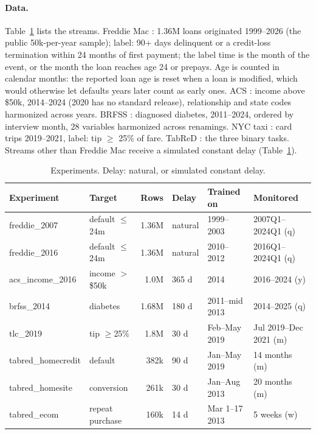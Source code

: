\documentclass[11pt]{article}
\begin{document}
\paragraph{Data.} Table~\ref{tab:streams} lists the streams. Freddie Mac
\citep{freddiemac_sflld}: 1.36M loans originated 1999--2026 (the public 50k-per-year sample);
label: 90+ days delinquent or a credit-loss termination within 24 months of first payment; the
label time is the month of the event, or the month the loan reaches age 24 or prepays. Age is
counted in calendar months: the reported loan age is reset when a loan is modified, which would
otherwise let defaults years later count as early ones. ACS
\citep{ding2021folktables}: income above \$50k, 2014--2024 (2020 has no standard release),
relationship and state codes harmonized across years. BRFSS \citep{cdc_brfss}: diagnosed
diabetes, 2011--2024, ordered by interview month, 28 variables harmonized across renamings.
NYC taxi \citep{nyc_tlc}: card trips 2019--2021, label: tip $\ge$ 25\% of fare. TabReD
\citep{rubachev2024tabred}: the three binary tasks. Streams other than Freddie Mac receive a
simulated constant delay (Table~\ref{tab:streams}).

\begin{table}[t]
\centering
\caption{Experiments. Delay: natural, or simulated constant delay.}
\label{tab:streams}
\small
\begin{tabular}{llrlll}
\toprule
Experiment & Target & Rows & Delay & Trained on & Monitored \\
\midrule
freddie\_2007 & default $\le$24m & 1.36M & natural & 1999--2003 & 2007Q1--2024Q1 (q) \\
freddie\_2016 & default $\le$24m & 1.36M & natural & 2010--2012 & 2016Q1--2024Q1 (q) \\
acs\_income\_2016 & income $>$\$50k & 1.0M & 365 d & 2014 & 2016--2024 (y) \\
brfss\_2014 & diabetes & 1.68M & 180 d & 2011--mid 2013 & 2014--2025 (q) \\
tlc\_2019 & tip $\ge$25\% & 1.8M & 30 d & Feb--May 2019 & Jul 2019--Dec 2021 (m) \\
tabred\_homecredit & default & 382k & 90 d & Jan--May 2019 & 14 months (m) \\
tabred\_homesite & conversion & 261k & 30 d & Jan--Aug 2013 & 20 months (m) \\
tabred\_ecom & repeat purchase & 160k & 14 d & Mar 1--17 2013 & 5 weeks (w) \\
\bottomrule
\end{tabular}
\end{table}
\end{document}
